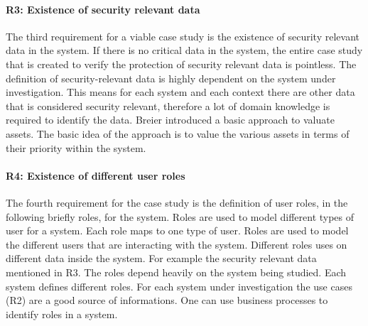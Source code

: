 \paragraph{R3: Existence of security relevant data}
The third requirement for a viable case study is the existence of security relevant data in the system. If there is no critical data in the system, the entire case study that is created to verify the protection of security relevant data is pointless. The definition of security-relevant data is highly dependent on the system under investigation. This means for each system and each context there are other data that is considered security relevant, therefore a lot of domain knowledge is required to identify the data. Breier \cite{assetValue} introduced a basic approach to valuate assets. The basic idea of the approach is to value the various assets in terms of their priority within the system. 

\paragraph{R4: Existence of different user roles}
The fourth requirement for the case study is the definition of user roles, in the following briefly roles, for the system. Roles are used to model different types of user for a system. Each role maps to one type of user. Roles are used to model the different users that are interacting with the system. Different roles uses on different data inside the system. For example the security relevant data mentioned in R3. The roles depend heavily on the system being studied. Each system defines different roles. For each system under investigation the use cases (R2) are a good source of informations. One can use business processes \cite{rolesBusiness} to identify roles in a system.
